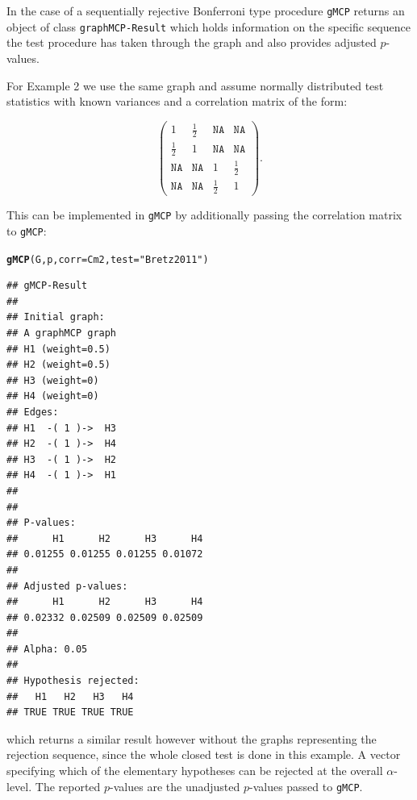 \documentclass[a4paper, 11pt]{article}\usepackage[]{graphicx}\usepackage[]{color}
\makeatletter
\newcommand{\hlstr}[1]{\textcolor[rgb]{0.192,0.494,0.8}{#1}}%
\newcommand{\hlstd}[1]{\textcolor[rgb]{0.345,0.345,0.345}{#1}}%
\newcommand{\hlkwc}[1]{\textcolor[rgb]{0.333,0.667,0.333}{#1}}%
\newcommand{\hlkwd}[1]{\textcolor[rgb]{0.737,0.353,0.396}{\textbf{#1}}}%
\newenvironment{kframe}{%
 \def\at@end@of@kframe{}%
 \ifinner\ifhmode%
  \def\at@end@of@kframe{\end{minipage}}%
  \begin{minipage}{\columnwidth}%
 \fi\fi%
 \def\FrameCommand##1{\hskip\@totalleftmargin \hskip-\fboxsep
 \colorbox{shadecolor}{##1}\hskip-\fboxsep
     \hskip-\linewidth \hskip-\@totalleftmargin \hskip\columnwidth}%
 \MakeFramed {\advance\hsize-\width
   \@totalleftmargin\z@ \linewidth\hsize
   \@setminipage}}%
 {\par\unskip\endMakeFramed%
 \at@end@of@kframe}
\newenvironment{knitrout}{}{} %
\newcommand{\al}{$\alpha$-level\xspace}
\newcommand{\gmcp}{\texttt{gMCP}\xspace}
\makeatother
\begin{document}
In the case of a sequentially rejective Bonferroni type procedure
\gmcp returns an object of class \texttt{graphMCP-Result} which holds
information on the specific sequence the test procedure has taken
through the graph and also provides adjusted $p$-values.

For Example 2 we use the same graph and assume normally distributed test
statistics with known variances and a correlation matrix of the form:

\begin{displaymath}
  \left( \begin{array}{cccc}
      1 & \frac{1}{2} & \texttt{NA} & \texttt{NA} \\
      \frac{1}{2} & 1 & \texttt{NA} & \texttt{NA} \\
      \texttt{NA} & \texttt{NA} & 1 & \frac{1}{2} \\
      \texttt{NA} & \texttt{NA} & \frac{1}{2} & 1
    \end{array} \right) .
\end{displaymath}

This can be implemented in \gmcp by additionally passing the correlation
matrix to \gmcp:

\begin{knitrout}
\color{fgcolor}\begin{kframe}
\begin{alltt}
\hlkwd{gMCP}\hlstd{(G, p,} \hlkwc{corr} \hlstd{= Cm2,} \hlkwc{test} \hlstd{=} \hlstr{"Bretz2011"}\hlstd{)}
\end{alltt}
\begin{verbatim}
## gMCP-Result
## 
## Initial graph:
## A graphMCP graph
## H1 (weight=0.5)
## H2 (weight=0.5)
## H3 (weight=0)
## H4 (weight=0)
## Edges:
## H1  -( 1 )->  H3 
## H2  -( 1 )->  H4 
## H3  -( 1 )->  H2 
## H4  -( 1 )->  H1 
## 
## 
## P-values:
##      H1      H2      H3      H4 
## 0.01255 0.01255 0.01255 0.01072 
## 
## Adjusted p-values:
##      H1      H2      H3      H4 
## 0.02332 0.02509 0.02509 0.02509 
## 
## Alpha: 0.05 
## 
## Hypothesis rejected:
##   H1   H2   H3   H4 
## TRUE TRUE TRUE TRUE
\end{verbatim}
\end{kframe}
\end{knitrout}


which returns a similar result however without the graphs representing
the rejection sequence, since the whole closed test is done in this
example. A vector specifying which of the elementary hypotheses
can be rejected at the overall \al. The reported $p$-values are the
unadjusted $p$-values passed to \gmcp. 

\newpage


\end{document}
